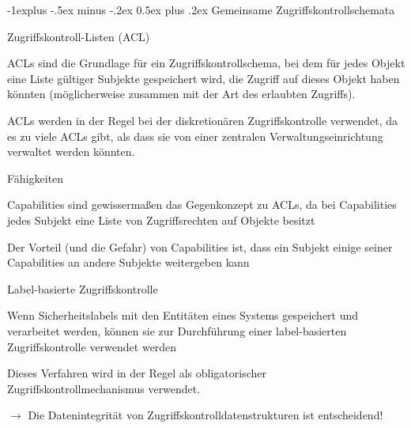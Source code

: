 \documentclass[a4paper]{article}
\makeatletter
\renewcommand{\subsection}{\@startsection{subsection}{2}{0mm}%
 {-1explus -.5ex minus -.2ex}%
 {0.5ex plus .2ex}%
 {\normalfont\normalsize\bfseries}}
\makeatother
\begin{document}
\begin{multicols}{3}

      \subsection{Gemeinsame Zugriffskontrollschemata}
      \begin{itemize*}
            \item Zugriffskontroll-Listen (ACL)
            \begin{itemize*}
                  \item ACLs sind die Grundlage für ein Zugriffskontrollschema, bei dem für jedes Objekt eine Liste gültiger Subjekte gespeichert wird, die Zugriff auf dieses Objekt haben könnten (möglicherweise zusammen mit der Art des erlaubten Zugriffs).
                  \item ACLs werden in der Regel bei der diskretionären Zugriffskontrolle verwendet, da es zu viele ACLs gibt, als dass sie von einer zentralen Verwaltungseinrichtung verwaltet werden könnten.
            \end{itemize*}
            \item Fähigkeiten
            \begin{itemize*}
                  \item Capabilities sind gewissermaßen das Gegenkonzept zu ACLs, da bei Capabilities jedes Subjekt eine Liste von Zugriffsrechten auf Objekte besitzt
                  \item Der Vorteil (und die Gefahr) von Capabilities ist, dass ein Subjekt einige seiner Capabilities an andere Subjekte weitergeben kann
            \end{itemize*}
            \item Label-basierte Zugriffskontrolle
            \begin{itemize*}
                  \item Wenn Sicherheitslabels mit den Entitäten eines Systems gespeichert und verarbeitet werden, können sie zur Durchführung einer label-basierten Zugriffskontrolle verwendet werden
                  \item Dieses Verfahren wird in der Regel als obligatorischer Zugriffskontrollmechanismus verwendet.
            \end{itemize*}
            \item[$\rightarrow$] Die Datenintegrität von Zugriffskontrolldatenstrukturen ist entscheidend!
      \end{itemize*}


\end{multicols}
\end{document}
